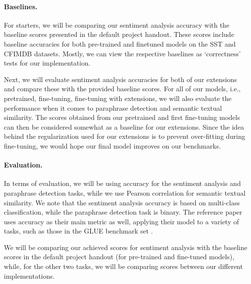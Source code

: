 \documentclass{article}
\begin{document}

\paragraph{Baselines.}
For starters, we will be comparing our sentiment analysis accuracy with the baseline scores presented in the default project handout. These scores include baseline accuracies for both pre-trained and finetuned models on the SST and CFIMDB datasets. Mostly, we can view the respective baselines as `correctness' tests for our implementation. 

Next, we will evaluate sentiment analysis accuracies for both of our extensions and compare these with the provided baseline scores. For all of our models, i.e., pretrained, fine-tuning, fine-tuning with extensions, we will also evaluate the performance when it comes to paraphrase detection and semantic textual similarity. The scores obtained from our pretrained and first fine-tuning models can then be considered somewhat as a baseline for our extensions. Since the idea behind the regularization used for our extensions is to prevent over-fitting during fine-tuning, we would hope our final model improves on our benchmarks.

\paragraph{Evaluation.}
In terms of evaluation, we will be using accuracy for the sentiment analysis and paraphrase detection tasks, while we use Pearson correlation for semantic textual similarity. We note that the sentiment analysis accuracy is based on multi-class classification, while the paraphrase detection task is binary. The reference paper uses accuracy as their main metric as well, applying their model to a variety of tasks, such as those in the GLUE benchmark set \cite{wang2018glue}.

We will be comparing our achieved scores for sentiment analysis with the baseline scores in the default project handout (for pre-trained and fine-tuned models), while, for the other two tasks, we will be comparing scores between our different implementations.
\end{document}
